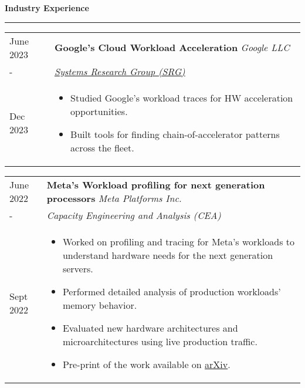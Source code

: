 \documentclass{article}
\newlength{\workexitemsep}
\newlength{\durlen}
\newlength{\deslen}
\newcommand{\sectiontitle}[1]{
  \textbf{\Large{\sffamily #1}}
  \begin{flushright}
      \vspace{-0.48cm} 
      \rule{0.975\textwidth}{1.1pt}
  \end{flushright}
  \vspace{-0.1cm} 
}
\begin{document}
\sectiontitle{Industry Experience}

\begin{tabular}{p{\durlen}p{\deslen}}
  \centering June 2023       & \textbf{Google's Cloud Workload Acceleration} \hfill \textit{Google LLC} \\
  \centering -               & \textit{\href{https://techsysinfra.google/research}{Systems Research Group (SRG)}}\\ 
  \centering Dec 2023        & \vspace{-0.6cm}\begin{itemize}[itemsep=\workexitemsep]
          \item Studied Google's workload traces for HW acceleration opportunities.
          \item Built tools for finding chain-of-accelerator patterns across the fleet.
  \end{itemize}
\end{tabular}

\begin{tabular}{p{\durlen} p{\deslen}}
  \centering June 2022       & \textbf{Meta's Workload profiling for next generation processors} \hfill \textit{Meta Platforms Inc.} \\
  \centering -               & \textit{Capacity Engineering and Analysis (CEA)} \\ 
  \centering Sept 2022       & \vspace{-0.6cm}\begin{itemize}[itemsep=\workexitemsep] 
          \item Worked on profiling and tracing for Meta's workloads to understand hardware needs for the next generation servers.
          \item Performed detailed analysis of production workloads' memory behavior.
          \item Evaluated new hardware architectures and microarchitectures using live production traffic.
          \item Pre-print of the work available on \href{https://arxiv.org/pdf/2303.08396}{arXiv}.
  \end{itemize}
\end{tabular}
\end{document}
